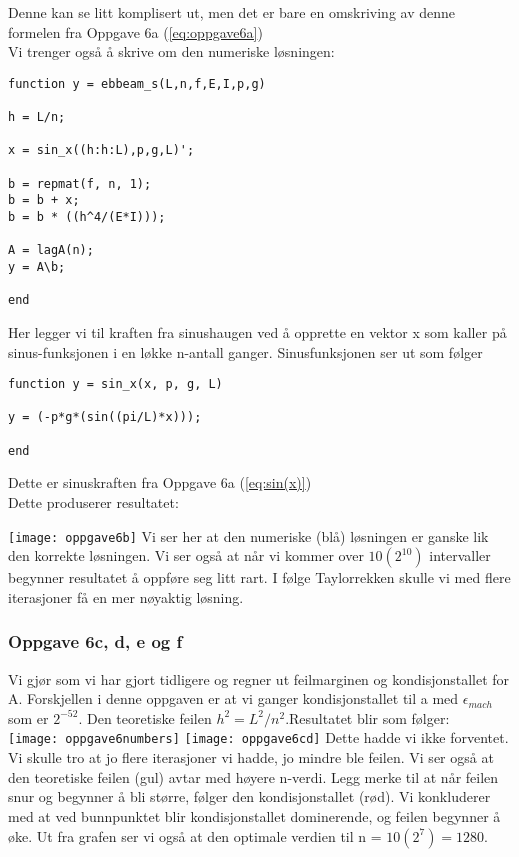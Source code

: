 Denne kan se litt komplisert ut, men det er bare en omskriving av denne formelen fra Oppgave 6a (\ref{eq:oppgave6a})
\\Vi trenger også å skrive om den numeriske løsningen:

\begin{lstlisting}
function y = ebbeam_s(L,n,f,E,I,p,g)

h = L/n;

x = sin_x((h:h:L),p,g,L)';

b = repmat(f, n, 1);
b = b + x;
b = b * ((h^4/(E*I)));

A = lagA(n);
y = A\b;

end
\end{lstlisting}

Her legger vi til kraften fra sinushaugen ved å opprette en vektor x som kaller på sinus-funksjonen i en løkke n-antall ganger. Sinusfunksjonen ser ut som følger

\begin{lstlisting}
function y = sin_x(x, p, g, L)

y = (-p*g*(sin((pi/L)*x)));

end
\end{lstlisting}

Dette er sinuskraften fra Oppgave 6a (\ref{eq:sin(x)})
\\Dette produserer resultatet:

\texttt{[image: oppgave6b]}
Vi ser her at den numeriske (blå) løsningen er ganske lik den korrekte løsningen. Vi ser også at når vi kommer over $10(2^{10})$ intervaller begynner resultatet å oppføre seg litt rart. I følge Taylorrekken skulle vi med flere iterasjoner få en mer nøyaktig løsning.

\subsubsection{Oppgave 6c, d, e og f}
Vi gjør som vi har gjort tidligere og regner ut feilmarginen og kondisjonstallet for A. Forskjellen i denne oppgaven er at vi ganger kondisjonstallet til a med $\epsilon_{mach}$ som er $2^{-52}$. Den teoretiske feilen $h^2 = L^2 / n^2$.Resultatet blir som følger:
\\
\texttt{[image: oppgave6numbers]}
\texttt{[image: oppgave6cd]}
Dette hadde vi ikke forventet. Vi skulle tro at jo flere iterasjoner vi hadde, jo mindre ble feilen. Vi ser også at den teoretiske feilen (gul) avtar med høyere n-verdi. Legg merke til at når feilen snur og begynner å bli større, følger den kondisjonstallet (rød). Vi konkluderer med at ved bunnpunktet blir kondisjonstallet dominerende, og feilen begynner å øke. Ut fra grafen ser vi også at den optimale verdien til n = $10(2^7) = 1280$.

